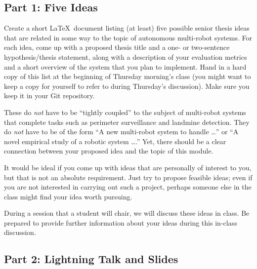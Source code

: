 

\usepackage[compact]{titlesec}




\subsection*{Part 1: Five Ideas}

Create a short \LaTeX\ document listing (at least) five possible senior thesis ideas that are related in some way to the
topic of autonomous multi-robot systems. For each idea, come up with a proposed thesis title and a one- or two-sentence
hypothesis/thesis statement, along with a description of your evaluation metrics and a short overview of the system that
you plan to implement. Hand in a hard copy of this list at the beginning of Thursday morning's class (you might want to
keep a copy for yourself to refer to during Thursday's discussion). Make sure you keep it in your Git repository.

These do {\em not} have to be ``tightly coupled'' to the subject of multi-robot systems that complete tasks such as
perimeter surveillance and landmine detection. They do {\em not} have to be of the form ``A new multi-robot system to
handle \ldots'' or ``A novel empirical study of a robotic system \ldots.'' Yet, there should be a clear connection
between your proposed idea and the topic of this module.

It would be ideal if you come up with ideas that are personally of interest to you, but that is not an absolute
requirement. Just try to propose feasible ideas; even if you are not interested in carrying out such a project, perhaps
someone else in the class might find your idea worth pursuing.

During a session that a student will chair, we will discuss these ideas in class. Be prepared to provide further
information about your ideas during this in-class discussion.

\subsection*{Part 2: Lightning Talk and Slides}

